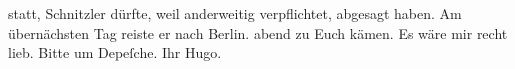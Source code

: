 \begin{ledgroupsized}[t]{13cm}
{{{                  statt, Schnitzler dürfte, weil anderweitig
                  verpflichtet, abgesagt haben. Am übernächsten Tag reiste er nach Berlin.}}}\label{K_L02093_3h}{ }abend zu Euch kämen. Es wäre mir recht lieb. Bitte um Depeſche.\pend
           \pstart Ihr \spacefill\mbox{Hugo.}\pend{}          \endnumbering{}\end{ledgroupsized}  \newcommand{\dateiname}{L02093}\newcommand{\titel}{Hugo von Hofmannsthal an Arthur Schnitzler, [6. 11. 1912]}\newcommand{\editorInnen}{Martin Anton Müller und Gerd-Hermann Susen}
            \footnotesize
\begin{ledgroupsized}[t]{11.5cm}
\end{ledgroupsized}
         
      